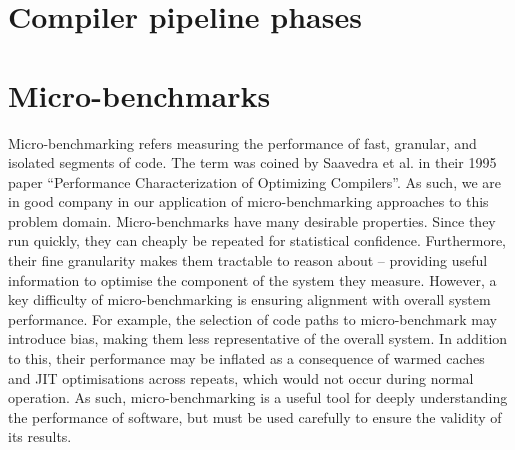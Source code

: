 




\section{Compiler pipeline phases}





\section{Micro-benchmarks}
\label{sec:ubenchmark}

Micro-benchmarking refers measuring the performance of fast, granular, and isolated segments of code.
The term was coined by Saavedra et al. in their 1995 paper \cite{saavedraPerformanceCharacterizationOptimizing1995} ``Performance Characterization of Optimizing Compilers''. As such, we are in good company in our application of micro-benchmarking approaches to this problem domain.
Micro-benchmarks have many desirable properties. Since they run quickly, they can cheaply be repeated for statistical confidence.
Furthermore, their fine granularity makes them tractable to reason about -- providing useful information to optimise the component of the system they measure.
However, a key difficulty of micro-benchmarking is ensuring alignment with overall system performance. For example, the selection of code paths to micro-benchmark may introduce bias, making them less representative of the overall system. In addition to this, their performance may be inflated as a consequence of warmed caches and JIT optimisations across repeats, which would not occur during normal operation.
As such, micro-benchmarking is a useful tool for deeply understanding the performance of software, but must be used carefully to ensure the validity of its results.

